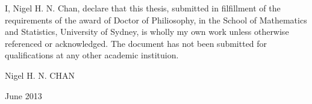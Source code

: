 
\begin{declaration} %
I, Nigel H. N. Chan, declare that this thesis, submitted in filfillment of the requirements of the award of Doctor of Philiosophy, in the School of Mathematics and Statistics, University of Sydney, is wholly my own work unless otherwise referenced or acknowledged. The document has not been submitted for qualifications at any other academic instituion. 

\vskip 2cm
\hfill Nigel H. N. CHAN

\hfill June 2013
\end{declaration}


